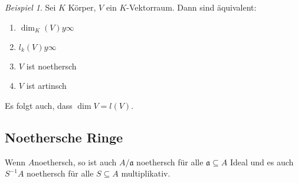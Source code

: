 \documentclass[10pt,a4paper]{article}
\newcounter{thm}[section]
\theoremstyle{definition}
\theoremstyle{plain}
\theoremstyle{remark}
\newtheorem{exm}[thm]{Beispiel}
\begin{document}
\begin{exm}
	Sei $K$ Körper, $V$ ein $K$-Vektorraum. Dann sind äquivalent:\begin{enumerate}
		\item $\dim_K(V)y\infty$
		\item $l_k(V)y\infty$
		\item $V$ ist noethersch
		\item $V$ ist artinsch
	\end{enumerate}
	Es folgt auch, dass $\dim V=l(V)$.
\end{exm}




\subsection{Noethersche Ringe}
Wenn $A$noethersch, so ist auch $A/\mathfrak a$ noethersch für alle $\mathfrak a\subseteq A$ Ideal und es auch $S^{-1}A$ noethersch für alle $S\subseteq A$ multiplikativ.
\end{document}
